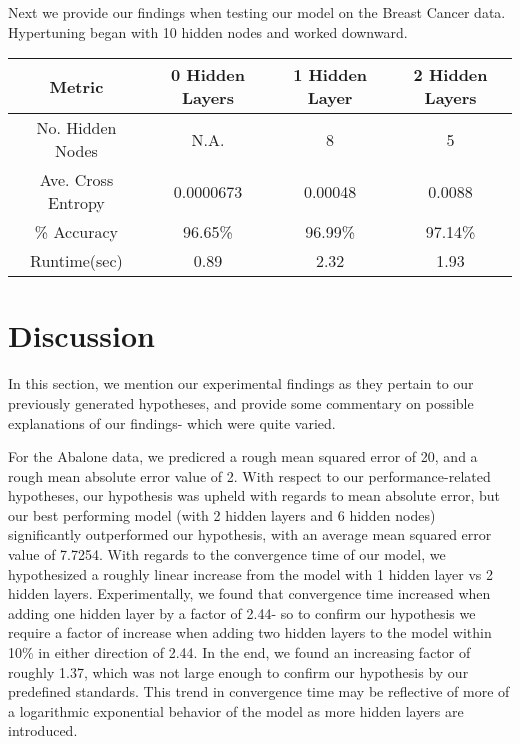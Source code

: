 \documentclass[twoside,11pt]{article}
\begin{document}
Next we provide our findings when testing our model on the Breast Cancer data. Hypertuning began with 10
hidden nodes and worked downward.
\begin{center}
	\begin{tabular}{|c c c c|}
		\hline
		Metric & 0 Hidden Layers & 1 Hidden Layer & 2 Hidden Layers \\ [0.5ex]
		\hline \hline
		No. Hidden Nodes & N.A. & 8 & 5 \\
		\hline
		Ave. Cross Entropy & 0.0000673 & 0.00048 & 0.0088 \\
		\hline
		\% Accuracy & 96.65\% & 96.99\% & 97.14\% \\
		\hline
		Runtime(sec) & 0.89 & 2.32 & 1.93 \\
		\hline
	\end{tabular}
\end{center}
\section{Discussion}

In this section, we mention our experimental findings as they pertain to our previously generated hypotheses,
and provide some commentary on possible explanations of our findings- which were quite varied.

For the Abalone data, we predicred a rough mean squared error of 20, and a rough mean absolute error value of 2.
With respect to our performance-related hypotheses, our hypothesis was upheld with regards to mean absolute error, but
our best performing model (with 2 hidden layers and 6 hidden nodes) significantly outperformed our hypothesis, with an 
average mean squared error value of 7.7254. With regards to the convergence time of our model, we hypothesized a roughly linear
increase from the model with 1 hidden layer vs 2 hidden layers. Experimentally, we found that convergence time increased when
adding one hidden layer by a factor of 2.44- so to confirm our hypothesis we require a factor of increase when adding
two hidden layers to the model within 10\% in either direction of 2.44. In the end, we found an increasing factor of roughly
1.37, which was not large enough to confirm our hypothesis by our predefined standards. This trend in convergence time
may be reflective of more of a logarithmic exponential behavior of the model as more hidden layers are introduced. 
\end{document}

